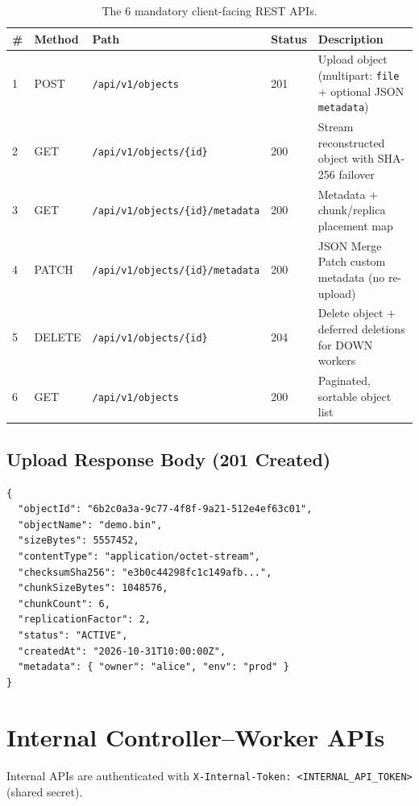 \documentclass[12pt,a4paper]{report}
\begin{document}
\begin{table}[H]
  \centering
  \caption{The 6 mandatory client-facing REST APIs.}
  \label{tab:client-apis}
  \begin{tabularx}{\textwidth}{llllX}
    \toprule
    \textbf{\#} & \textbf{Method} & \textbf{Path} & \textbf{Status} & \textbf{Description} \\
    \midrule
    1 & POST   & \texttt{/api/v1/objects}                       & 201 & Upload object (multipart: \texttt{file} + optional JSON \texttt{metadata}) \\
    2 & GET    & \texttt{/api/v1/objects/\{id\}}               & 200 & Stream reconstructed object with SHA-256 failover \\
    3 & GET    & \texttt{/api/v1/objects/\{id\}/metadata}      & 200 & Metadata + chunk/replica placement map \\
    4 & PATCH  & \texttt{/api/v1/objects/\{id\}/metadata}      & 200 & JSON Merge Patch custom metadata (no re-upload) \\
    5 & DELETE & \texttt{/api/v1/objects/\{id\}}               & 204 & Delete object + deferred deletions for DOWN workers \\
    6 & GET    & \texttt{/api/v1/objects}                      & 200 & Paginated, sortable object list \\
    \bottomrule
  \end{tabularx}
\end{table}

\subsection{Upload Response Body (201 Created)}
\begin{lstlisting}[style=jsonStyle, caption=Upload response --- ObjectInfo JSON]
{
  "objectId": "6b2c0a3a-9c77-4f8f-9a21-512e4ef63c01",
  "objectName": "demo.bin",
  "sizeBytes": 5557452,
  "contentType": "application/octet-stream",
  "checksumSha256": "e3b0c44298fc1c149afb...",
  "chunkSizeBytes": 1048576,
  "chunkCount": 6,
  "replicationFactor": 2,
  "status": "ACTIVE",
  "createdAt": "2026-10-31T10:00:00Z",
  "metadata": { "owner": "alice", "env": "prod" }
}
\end{lstlisting}

\section{Internal Controller--Worker APIs}

Internal APIs are authenticated with \texttt{X-Internal-Token: <INTERNAL\_API\_TOKEN>} (shared secret).
\end{document}

